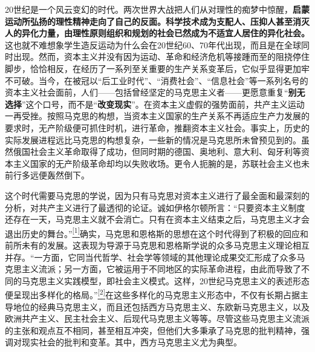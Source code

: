 \documentclass[UTF8, fontset = sourcesans, a4paper, oneside, zihao =
-4, scheme=chinese, no-math, space=true]{ctexbook}
\begin{document}
20世纪是一个风云变幻的时代。两次世界大战把人们从对理性的痴梦中惊醒，\textbf{启蒙运动所弘扬的理性精神走向了自己的反面。科学技术成为支配人、压抑人甚至消灭人的异化力量，由理性原则组织和规划的社会已然成为不适宜人居住的异化社会。}这也就不难想象学生造反运动为什么会在20世纪60、70年代出现，而且是在全球同时出现。然而，资本主义并没有因为运动、革命和经济危机等接踵而至的阻挠停住脚步，恰恰相反，在经历了一系列至关重要的生产关系变革后，它似乎显得更加牢不可破。当今，在被冠以``后工业时代''、``消费社会''、``信息社会''等一系列名号的资本主义社会面前，人们------包括曾经坚定的马克思主义者------更愿意重复``\textbf{别无选择}''这个口号，而不是``\textbf{改变现实}''。在资本主义虚假的强势面前，共产主义运动一再受挫。按照马克思的构想，当资本主义国家的生产关系不再适应生产力发展的要求时，无产阶级便可抓住时机，进行革命，推翻资本主义社会。事实上，历史的实际发展进程远比马克思的构想复杂，一些新的情况是马克思所未曾预见到的。虽然俄国社会主义革命取得了成功，但同时期的德国、奥地利、意大利、匈牙利等资本主义国家的无产阶级革命却均以失败收场。更令人扼腕的是，苏联社会主义也未前行多远便轰然倒下。

这个时代需要马克思的学说，因为只有马克思对资本主义进行了最全面和最深刻的分析，对共产主义进行了最透彻的论证。诚如伊格尔顿所言：``只要资本主义制度还存在一天，马克思主义就不会消亡。只有在资本主义结束之后，马克思主义才会退出历史的舞台。''\protect\hypertarget{part0004.htmlux5cux23w1}{}{}\protect\hyperlink{part0004.htmlux5cux23m1}{\textsuperscript{{[}1{]}}}确实，马克思和恩格斯的思想在这个时代得到了积极的回应和前所未有的发展。这表现为导源于马克思和恩格斯学说的众多马克思主义理论相互并存。``一方面，它同当代哲学、社会学等领域的其他理论成果交汇形成了众多马克思主义流派；另一方面，它被运用于不同地区的实际革命进程，由此而导致了不同的马克思主义实践模型，即社会主义模式。这样，20世纪马克思主义的表述形态便呈现出多样化的格局。''\protect\hypertarget{part0004.htmlux5cux23w2}{}{}\protect\hyperlink{part0004.htmlux5cux23m2}{\textsuperscript{{[}2{]}}}在这些多样化的马克思主义形态中，不仅有长期占据主导地位的经典马克思主义，而且还包括西方马克思主义、东欧新马克思主义，以及欧洲共产主义、民主社会主义、后现代马克思主义等等。尽管这些马克思主义流派的主张和观点互不相同，甚至相互冲突，但他们大多秉承了马克思的批判精神，强调对现实社会的批判和变革。其中，西方马克思主义尤为典型。
\end{document}
